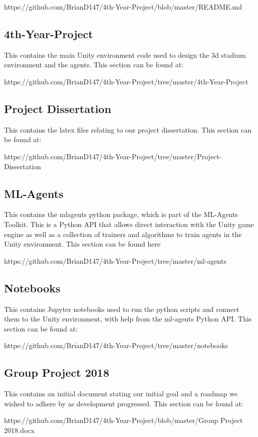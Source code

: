     https://github.com/BrianD147/4th-Year-Project/blob/master/README.md

\subsection{4th-Year-Project}
This contains the main Unity environment code used to design the 3d stadium environment and the agents. 
This section can be found at:

    https://github.com/BrianD147/4th-Year-Project/tree/master/4th-Year-Project

\subsection{Project Dissertation}
This contains the latex files relating to our project dissertation.
This section can be found at: 

    https://github.com/BrianD147/4th-Year-Project/tree/master/Project-Dissertation

\subsection{ML-Agents}
This contains the mlagents python package, which is part of the ML-Agents Toolkit. This is a Python API that allows direct interaction with the Unity game engine as well as a collection of trainers and algorithms to train agents in the Unity environment.
This section can be found here

    https://github.com/BrianD147/4th-Year-Project/tree/master/ml-agents

\subsection{Notebooks}
This contains Jupyter notebooks used to run the python scripts and connect them to the Unity environment, with help from the ml-agents Python API.
This section can be found at: 

    https://github.com/BrianD147/4th-Year-Project/tree/master/notebooks

\subsection{Group Project 2018}
This contains an initial document stating our initial goal and a roadmap we wished to adhere by as development progressed.
This section can be found at:             

    https://github.com/BrianD147/4th-Year-Project/blob/master/Group Project 2018.docx

